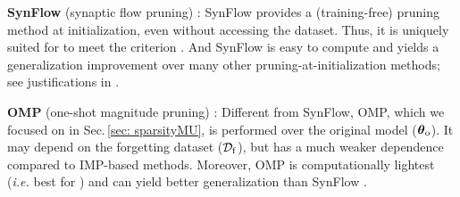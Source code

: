 \noindent  {} \textbf{SynFlow} (synaptic flow pruning) \cite{tanaka2020pruning}: 
SynFlow provides a (training-free) pruning method at initialization, even without   accessing the dataset. %
Thus, it is uniquely suited for {\MU} to meet  the criterion . And SynFlow is easy to compute and yields a generalization improvement over many other pruning-at-initialization methods; see justifications in \cite{tanaka2020pruning}.


  
\noindent {} \textbf{OMP} (one-shot magnitude pruning)  \cite{ma2021sanity}: 
Different from SynFlow, {OMP}, which we focused on in Sec.\,\ref{sec: sparsityMU},
is performed over the original model   ($\boldsymbol \theta_\mathrm{o}$). It may depend on
the forgetting dataset ($\mathcal D_\mathrm{f}$), but has a much weaker dependence compared to {IMP}-based methods.
Moreover, {OMP} is  computationally lightest (\textit{i.e.}  best for ) and    can yield better generalization than {SynFlow} \cite{zhang2022advancing}.


